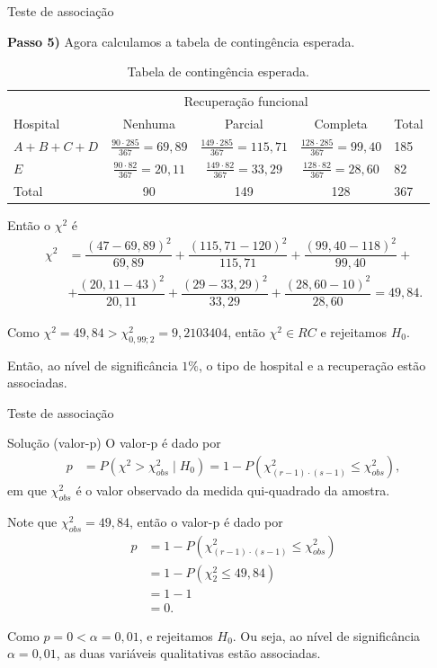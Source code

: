 \documentclass[9pt]{beamer}
\begin{document}
\begin{frame}{Teste de associação}

\small
	{\bf Passo 5)}
	Agora calculamos a tabela de contingência esperada.
	\begin{table}[htbp]
		\centering
		\caption{Tabela de contingência esperada.}
		\label{tab:esperada}
		\begin{tabular}{l|ccc|l}
			\toprule[0.05cm]
			& \multicolumn{3}{|c|}{Recuperação funcional} & \\ \cmidrule[0.05cm]{2-4}
			Hospital & Nenhuma & Parcial & Completa & Total \\ \midrule[0.05cm]
			$A+B+C+D$ & $\frac{90\cdot 285}{367} = 69,89$ & $\frac{149\cdot 285}{367}= 115,71$  & $\frac{128\cdot 285}{367} =99,40$  & 185\\
			$E$ & $\frac{90\cdot 82}{367} = 20,11$ & $\frac{149 \cdot 82}{367} = 33,29$ & $\frac{128 \cdot 82}{367} = 28,60$ & 82 \\ \midrule[0.05cm]
			Total & 90 & 149 & 128 & 367\\ \bottomrule[0.05cm]
		\end{tabular}
	\end{table}
	Então o $\chi^2$ é 
	\begin{align*}
	\chi^2 &= \dfrac{(47-69,89)^2}{69,89} + \dfrac{(115,71-120)^2}{115,71} + \dfrac{(99,40-118)^2}{99,40}+\\
	&+ \dfrac{(20,11-43)^2}{20,11} + \dfrac{(29-33,29)^2}{33,29} + \dfrac{(28,60-10)^2}{28,60} = 49,84.
	\end{align*}
	
	Como $\chi^2 = 49,84 > \chi^2_{0,99;2} = 9,2103404$, então $\chi^2 \in RC$ e rejeitamos $H_0$.
	\vfill
	
	Então, ao nível de significância $1\%$, o tipo de hospital e a recuperação estão associadas.
	
\normalsize
\end{frame}

\begin{frame}{Teste de associação}

\begin{block}{Solução (valor-p)}
	O  valor-p é dado por
	\begin{align*}
		p &= P \left( \chi^2 > \chi^2_{obs} \mid H_0 \right) = 1 - P \left( \chi^2_{(r-1)\cdot (s-1)} \leq \chi^2_{obs} \right),
	\end{align*}
	em que $\chi^2_{obs}$ é o valor observado da medida qui-quadrado da amostra.
	
	Note que $\chi^2_{obs} = 49,84$, então o valor-p é dado por
	\begin{align*}
		p &= 1 - P \left( \chi^2_{(r-1)\cdot (s-1)} \leq \chi^2_{obs} \right)\\
		&= 1 - P \left( \chi_{2}^2 \leq 49,84 \right)\\
		&= 1 - 1\\
		&= 0.
	\end{align*}
	
	Como $p = 0 < \alpha = 0,01$, e rejeitamos $H_0$. Ou seja, ao nível de significância $\alpha=0,01$, as duas variáveis qualitativas estão associadas. 
\end{block}

\end{frame}
\end{document}
